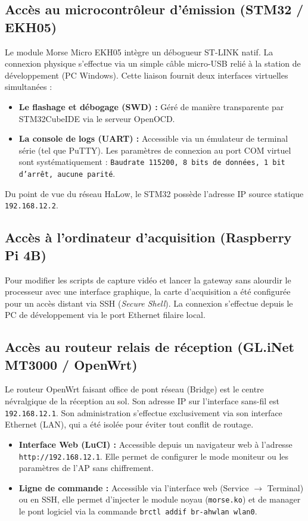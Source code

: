 \documentclass[a4paper,12pt]{article}
\begin{document}
\subsection{Accès au microcontrôleur d'émission (STM32 / EKH05)}
Le module Morse Micro EKH05 intègre un débogueur ST-LINK natif. La connexion physique s'effectue via un simple câble micro-USB relié à la station de développement (PC Windows). 
Cette liaison fournit deux interfaces virtuelles simultanées :
\begin{itemize}
    \item \textbf{Le flashage et débogage (SWD) :} Géré de manière transparente par STM32CubeIDE via le serveur OpenOCD.
    \item \textbf{La console de logs (UART) :} Accessible via un émulateur de terminal série (tel que PuTTY). Les paramètres de connexion au port COM virtuel sont systématiquement : \texttt{Baudrate 115200, 8 bits de données, 1 bit d'arrêt, aucune parité}.
\end{itemize}
Du point de vue du réseau HaLow, le STM32 possède l'adresse IP source statique \texttt{192.168.12.2}.

\subsection{Accès à l'ordinateur d'acquisition (Raspberry Pi 4B)}
Pour modifier les scripts de capture vidéo et lancer la gateway sans alourdir le processeur avec une interface graphique, la carte d'acquisition a été configurée pour un accès distant via SSH (\textit{Secure Shell}). La connexion s'effectue depuis le PC de développement via le port Ethernet filaire local.

\subsection{Accès au routeur relais de réception (GL.iNet MT3000 / OpenWrt)}
Le routeur OpenWrt faisant office de pont réseau (Bridge) est le centre névralgique de la réception au sol. Son adresse IP sur l'interface sans-fil est \texttt{192.168.12.1}. Son administration s'effectue exclusivement via son interface Ethernet (LAN), qui a été isolée pour éviter tout conflit de routage.
\begin{itemize}
    \item \textbf{Interface Web (LuCI) :} Accessible depuis un navigateur web à l'adresse \texttt{http://192.168.12.1}. Elle permet de configurer le mode moniteur ou les paramètres de l'AP sans chiffrement.
    \item \textbf{Ligne de commande :} Accessible via l'interface web (Service $\rightarrow$ Terminal) ou en SSH, elle permet d'injecter le module noyau (\texttt{morse.ko}) et de manager le pont logiciel via la commande \texttt{brctl addif br-ahwlan wlan0}.
\end{itemize}
\end{document}
